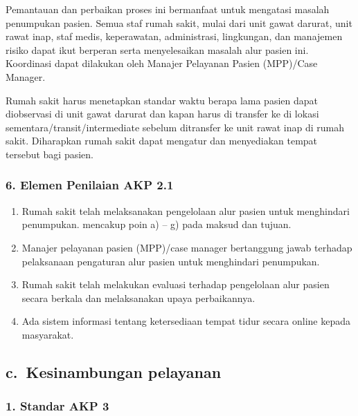 \documentclass[
]{book}
\providecommand{\tightlist}{%
  \setlength{\itemsep}{0pt}\setlength{\parskip}{0pt}}
\begin{document}
Pemantauan dan perbaikan proses ini bermanfaat untuk mengatasi masalah penumpukan pasien. Semua staf rumah sakit, mulai dari unit gawat darurat, unit rawat inap, staf medis, keperawatan, administrasi, lingkungan, dan manajemen risiko dapat ikut berperan serta menyelesaikan masalah alur pasien ini. Koordinasi dapat dilakukan oleh Manajer Pelayanan Pasien (MPP)/Case Manager.

Rumah sakit harus menetapkan standar waktu berapa lama pasien dapat diobservasi di unit gawat darurat dan kapan harus di transfer ke di lokasi sementara/transit/intermediate sebelum ditransfer ke unit rawat inap di rumah sakit. Diharapkan rumah sakit dapat mengatur dan menyediakan tempat tersebut bagi pasien.

\hypertarget{elemen-penilaian-akp-2.1}{%
\subsubsection*{6. Elemen Penilaian AKP 2.1}\label{elemen-penilaian-akp-2.1}}

\begin{enumerate}
\def\labelenumi{\alph{enumi}.}
\tightlist
\item
  Rumah sakit telah melaksanakan pengelolaan alur pasien untuk menghindari penumpukan. mencakup poin a) -- g) pada maksud dan tujuan.
\item
  Manajer pelayanan pasien (MPP)/case manager bertanggung jawab terhadap pelaksanaan pengaturan alur pasien untuk menghindari penumpukan.
\item
  Rumah sakit telah melakukan evaluasi terhadap pengelolaan alur pasien secara berkala dan melaksanakan upaya perbaikannya.
\item
  Ada sistem informasi tentang ketersediaan tempat tidur secara online kepada masyarakat.
\end{enumerate}

\hypertarget{c.-kesinambungan-pelayanan}{%
\subsection*{c.~Kesinambungan pelayanan}\label{c.-kesinambungan-pelayanan}}

\hypertarget{standar-akp-3}{%
\subsubsection*{1. Standar AKP 3}\label{standar-akp-3}}
\end{document}
